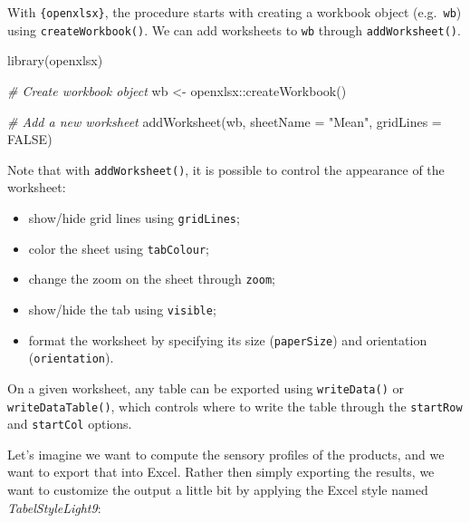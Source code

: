 \documentclass[
]{krantz}
\makeatletter
\newenvironment{Shaded}{\begin{snugshade}}{\end{snugshade}}
\newcommand{\AttributeTok}[1]{\textcolor[rgb]{0.61,0.61,0.61}{#1}}
\newcommand{\CommentTok}[1]{\textcolor[rgb]{0.37,0.37,0.37}{\textit{#1}}}
\newcommand{\ConstantTok}[1]{\textcolor[rgb]{0,0,0}{#1}}
\newcommand{\FunctionTok}[1]{\textcolor[rgb]{0,0,0}{#1}}
\newcommand{\NormalTok}[1]{#1}
\newcommand{\OtherTok}[1]{\textcolor[rgb]{0.37,0.37,0.37}{#1}}
\newcommand{\SpecialCharTok}[1]{\textcolor[rgb]{0,0,0}{#1}}
\newcommand{\StringTok}[1]{\textcolor[rgb]{0.5,0.5,0.5}{#1}}
\providecommand{\tightlist}{%
  \setlength{\itemsep}{0pt}\setlength{\parskip}{0pt}}
\newenvironment{kframe}{%
\medskip{}
\setlength{\fboxsep}{.8em}
 \def\at@end@of@kframe{}%
 \ifinner\ifhmode%
  \def\at@end@of@kframe{\end{minipage}}%
  \begin{minipage}{\columnwidth}%
 \fi\fi%
 \def\FrameCommand##1{\hskip\@totalleftmargin \hskip-\fboxsep
 \colorbox{shadecolor}{##1}\hskip-\fboxsep
     \hskip-\linewidth \hskip-\@totalleftmargin \hskip\columnwidth}%
 \MakeFramed {\advance\hsize-\width
   \@totalleftmargin\z@ \linewidth\hsize
   \@setminipage}}%
 {\par\unskip\endMakeFramed%
 \at@end@of@kframe}
\renewenvironment{Shaded}{\begin{kframe}}{\end{kframe}}
\makeatother
\begin{document}
With \texttt{\{openxlsx\}}, the procedure starts with creating a workbook object (e.g.~\texttt{wb}) using \texttt{createWorkbook()}. We can add worksheets to \texttt{wb} through \texttt{addWorksheet()}.

\begin{Shaded}
\begin{Highlighting}[]
\FunctionTok{library}\NormalTok{(openxlsx)}

\CommentTok{\# Create workbook object}
\NormalTok{wb }\OtherTok{\textless{}{-}}\NormalTok{ openxlsx}\SpecialCharTok{::}\FunctionTok{createWorkbook}\NormalTok{()}

\CommentTok{\# Add a new worksheet}
\FunctionTok{addWorksheet}\NormalTok{(wb, }\AttributeTok{sheetName =} \StringTok{"Mean"}\NormalTok{, }\AttributeTok{gridLines =} \ConstantTok{FALSE}\NormalTok{)}
\end{Highlighting}
\end{Shaded}

Note that with \texttt{addWorksheet()}, it is possible to control the appearance of the worksheet:

\begin{itemize}
\tightlist
\item
  show/hide grid lines using \texttt{gridLines};
\item
  color the sheet using \texttt{tabColour};
\item
  change the zoom on the sheet through \texttt{zoom};
\item
  show/hide the tab using \texttt{visible};
\item
  format the worksheet by specifying its size (\texttt{paperSize}) and orientation (\texttt{orientation}).
\end{itemize}

On a given worksheet, any table can be exported using \texttt{writeData()} or \texttt{writeDataTable()}, which controls where to write the table through the \texttt{startRow} and \texttt{startCol} options.

Let's imagine we want to compute the sensory profiles of the products, and we want to export that into Excel. Rather then simply exporting the results, we want to customize the output a little bit by applying the Excel style named \emph{TabelStyleLight9}:
\end{document}
